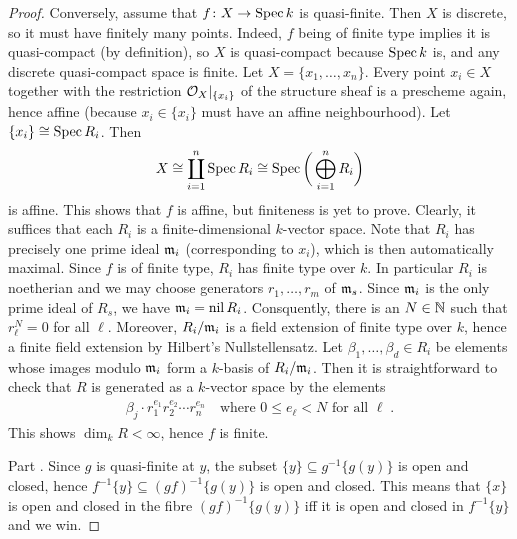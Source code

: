 \documentclass[a4paper,parskip=half,numbers=enddot, DIV=12]{scrreprt}
\renewcommand{\leq}{\leqslant}
\begin{document}
\begin{proof}
	Conversely, assume that $f\colon X\morphism\Spec k$ is quasi-finite. Then $X$ is discrete, so it must have finitely many points. Indeed, $f$ being of finite type implies it is quasi-compact (by definition), so $X$ is quasi-compact because $\operatorname{Spec} k$ is, and any discrete quasi-compact space is finite. Let $X=\{x_1,\ldots,x_n\}$. Every point $x_i\in X$ together with the restriction $\mathcal{O}_X|_{\{x_i\}}$ of the structure sheaf is a prescheme again, hence affine (because $x_i\in\{x_i\}$ must have an affine neighbourhood). Let $\{x_i\}\cong \operatorname{Spec} R_i$. Then
	\begin{align*}
		X\cong\coprod_{i=1}^n\operatorname{Spec} R_i\cong\operatorname{Spec}\bigg(\bigoplus_{i=1}^nR_i\bigg)
	\end{align*}
	is affine. This shows that $f$ is affine, but finiteness is yet to prove. Clearly, it suffices that each $R_i$ is a finite-dimensional $k$-vector space. Note that $R_i$ has precisely one prime ideal $\mathfrak{m}_i$ (corresponding to $x_i$), which is then automatically maximal. Since $f$ is of finite type, $R_i$ has finite type over $k$. In particular $R_i$ is noetherian and we may choose generators $r_1,\ldots,r_m$ of $\mathfrak{m}_s$. Since $\mathfrak{m}_i$ is the only prime ideal of $R_s$, we have $\mathfrak{m}_i=\operatorname{nil} R_i$. Consquently, there is an $N\in\mathbb{N}$ such that $r_\ell^N=0$ for all $\ell$. Moreover, $R_i/\mathfrak{m}_i$ is a field extension of finite type over $k$, hence a finite field extension by Hilbert's Nullstellensatz. Let $\beta_1,\ldots,\beta_d\in R_i$ be elements whose images modulo $\mathfrak{m}_i$ form a $k$-basis of $R_i/\mathfrak{m}_i$. Then it is straightforward to check that $R$ is generated as a $k$-vector space by the elements
	\begin{align*}
	\beta_j\cdot r_1^{e_1}r_2^{e_2}\cdots r_n^{e_n}\quad\text{where }0\leq e_\ell<N\text{ for all }\ell\;.
	\end{align*}
	This shows $\dim_kR<\infty$, hence $f$ is finite.
	
	Part . Since $g$ is quasi-finite at $y$, the subset $\{y\}\subseteq g^{-1}\{g(y)\}$ is open and closed, hence $f^{-1}\{y\}\subseteq (gf)^{-1}\{g(y)\}$ is open and closed. This means that $\{x\}$ is open and closed in the fibre $(gf)^{-1}\{g(y)\}$  iff it is open and closed in $f^{-1}\{y\}$ and we win.
\end{proof}
\end{document}
